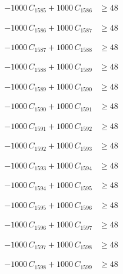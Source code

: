 \documentclass[a4paper,11pt]{article}
\begin{document}
\begin{align}
-1000\,C_{1585} + 1000\,C_{1586} &\geq 48 \nonumber
\end{align}

\begin{align}
-1000\,C_{1586} + 1000\,C_{1587} &\geq 48 \nonumber
\end{align}

\begin{align}
-1000\,C_{1587} + 1000\,C_{1588} &\geq 48 \nonumber
\end{align}

\begin{align}
-1000\,C_{1588} + 1000\,C_{1589} &\geq 48 \nonumber
\end{align}

\begin{align}
-1000\,C_{1589} + 1000\,C_{1590} &\geq 48 \nonumber
\end{align}

\begin{align}
-1000\,C_{1590} + 1000\,C_{1591} &\geq 48 \nonumber
\end{align}

\begin{align}
-1000\,C_{1591} + 1000\,C_{1592} &\geq 48 \nonumber
\end{align}

\begin{align}
-1000\,C_{1592} + 1000\,C_{1593} &\geq 48 \nonumber
\end{align}

\begin{align}
-1000\,C_{1593} + 1000\,C_{1594} &\geq 48 \nonumber
\end{align}

\begin{align}
-1000\,C_{1594} + 1000\,C_{1595} &\geq 48 \nonumber
\end{align}

\begin{align}
-1000\,C_{1595} + 1000\,C_{1596} &\geq 48 \nonumber
\end{align}

\begin{align}
-1000\,C_{1596} + 1000\,C_{1597} &\geq 48 \nonumber
\end{align}

\begin{align}
-1000\,C_{1597} + 1000\,C_{1598} &\geq 48 \nonumber
\end{align}

\begin{align}
-1000\,C_{1598} + 1000\,C_{1599} &\geq 48 \nonumber
\end{align}
\end{document}

